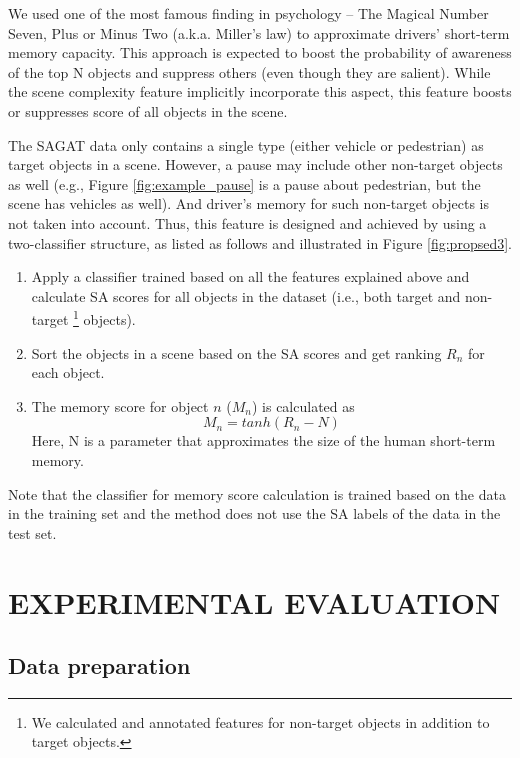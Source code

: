 \documentclass[letterpaper, 10 pt, conference]{ieeeconf}  %
\begin{document}
We used one of the most famous finding in psychology -- The Magical Number Seven, Plus or Minus Two (a.k.a. Miller's law) \cite{miller1956magical} to approximate drivers' short-term memory capacity. This approach is expected to boost the probability of awareness of the top N objects and suppress others (even though they are salient). While the scene complexity feature implicitly incorporate this aspect, this feature boosts or suppresses score of all objects in the scene.

The SAGAT data only contains a single type (either vehicle or pedestrian) as target objects in a scene. However, a pause may include other non-target objects as well (e.g., Figure \ref{fig:example_pause} is a pause about pedestrian, but the scene has vehicles as well). And driver's memory for such non-target objects is not taken into account. Thus, this feature is designed and achieved by using a two-classifier structure, as listed as follows and illustrated in Figure \ref{fig:propsed3}.
\begin{enumerate}
    \item Apply a classifier trained based on all the features explained above and calculate SA scores for all objects in the dataset (i.e., both target and non-target \footnote{We calculated and annotated features for non-target objects in addition to target objects.} objects).
    \item Sort the objects in a scene based on the SA scores and get ranking $R_n$ for each object.
    \item The memory score for object $n$ ($M_n$) is calculated as
    \begin{equation}
        M_n = tanh(R_n - N)
    \end{equation}
    Here, N is a parameter that approximates the size of the human short-term memory.
\end{enumerate}
Note that the classifier for memory score calculation is trained based on the data in the training set and the method does not use the SA labels of the data in the test set.


\section{EXPERIMENTAL EVALUATION}

\subsection{Data preparation}
\end{document}
